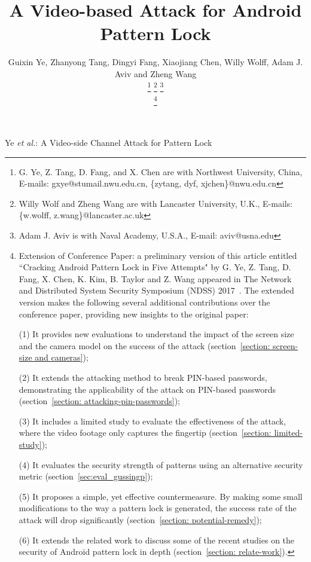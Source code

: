 \documentclass[journal,table,twoside]{IEEEtran}
\begin{document}
\title{A Video-based Attack for Android Pattern Lock}
\author{Guixin Ye, Zhanyong Tang, Dingyi Fang, Xiaojiang Chen,
        Willy Wolff, Adam J. Aviv and Zheng Wang

    \thanks{G. Ye, Z. Tang, D. Fang, and X. Chen are with Northwest University, China, E-mails: gxye@stumail.nwu.edu.cn, \{zytang, dyf, xjchen\}@nwu.edu.cn }%
    \thanks{Willy Wolf and Zheng Wang are with Lancaster University, U.K., E-mails: \{w.wolff, z.wang\}@lancaster.ac.uk}%
    \thanks{Adam J. Aviv is with Naval Academy, U.S.A., E-mail: aviv@usna.edu}

    \thanks{
            Extension of Conference Paper: a preliminary version of this article entitled ``Cracking Android Pattern Lock
            in Five Attempts" by G. Ye, Z. Tang, D. Fang, X. Chen, K. Kim, B. Taylor and Z. Wang appeared in
            The Network and Distributed System Security Symposium (NDSS) 2017~\cite{ye2017cracking}.
            The extended version makes the following several additional contributions over the conference
            paper, providing new insights to the original paper:

            (1)	It provides new evaluations to understand the impact of the screen size and the camera model on the success of the attack (section~\ref{section: screen-size and cameras});

            (2)	It extends the attacking method to break PIN-based passwords, demonstrating the applicability of the attack on PIN-based passwords (section~\ref{section: attacking-pin-passwords});

            (3)	It includes a limited study to evaluate the effectiveness of the attack, where the video footage only captures the fingertip (section~\ref{section: limited-study});

            (4) It evaluates the security strength of patterns using an alternative security metric (section~\ref{sec:eval_gussingp});

            (5)	It proposes a simple, yet effective countermeasure. By making some small modifications to the way a pattern lock is generated, the success rate of the attack will drop significantly (section~\ref{section: potential-remedy});

            (6)	It extends the related work to discuss some of the recent studies on the security of Android pattern lock in depth (section~\ref{section: relate-work}).

    }
}

%
{Ye \MakeLowercase{\textit{et al.}}: A Video-side Channel Attack for Pattern Lock}
\end{document}
